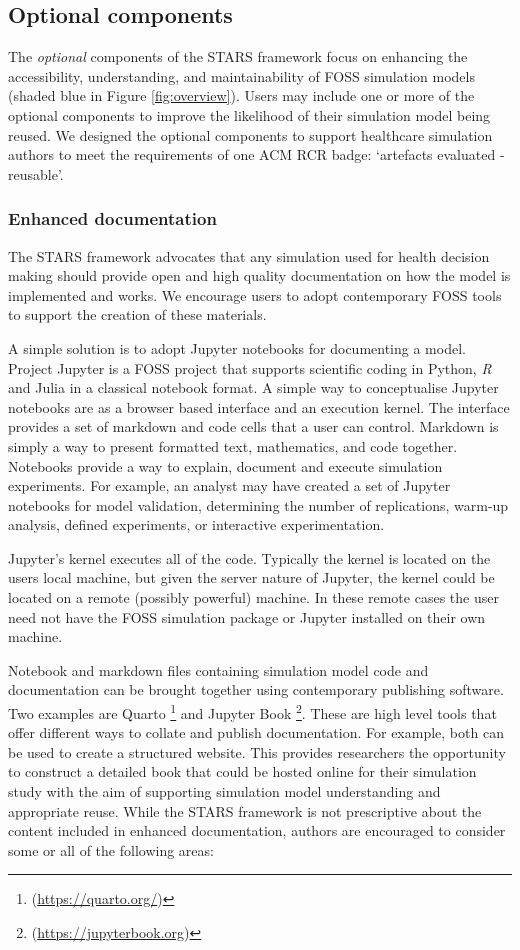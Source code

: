 \documentclass[]{interact}
\theoremstyle{plain}%
\theoremstyle{definition}
\theoremstyle{remark}
\begin{document}
\subsection{Optional components}

The \textit{optional} components of the STARS framework focus on enhancing the accessibility, understanding, and maintainability of FOSS simulation models  (shaded blue in Figure \ref{fig:overview}).  Users may include one or more of the optional components to improve the likelihood of their simulation model being reused. We designed the optional components to support healthcare simulation authors to meet the requirements of one ACM RCR badge: `artefacts evaluated - reusable'.

\subsubsection{Enhanced documentation}
\label{enhanced_docs}

The STARS framework advocates that any simulation used for health decision making should provide open and high quality documentation on how the model is implemented and works. We encourage users to adopt contemporary FOSS tools to support the creation of these materials.  

A simple solution is to adopt Jupyter notebooks for documenting a model.  Project Jupyter is a FOSS project that supports scientific coding in Python, \textit{R} and Julia in a classical notebook format.  A simple way to conceptualise Jupyter notebooks are as a browser based interface and an execution kernel.  The interface provides a set of markdown and code cells that a user can control. Markdown is simply a way to present formatted text, mathematics, and code together. Notebooks provide a way to explain, document and execute simulation experiments. For example, an analyst may have created a set of Jupyter notebooks for model validation, determining the number of replications, warm-up analysis, defined experiments, or interactive experimentation.  

Jupyter's kernel executes all of the code.  Typically the kernel is located on the users local machine, but given the server nature of Jupyter, the kernel could be located on a remote (possibly powerful) machine.  In these remote cases the user need not have the FOSS simulation package or Jupyter installed on their own machine.


Notebook and markdown files containing simulation model code and documentation can be brought together using contemporary publishing software. Two examples are Quarto \footnote{(\url{https://quarto.org/})} and Jupyter Book \footnote{(\url{https://jupyterbook.org})}.  These are high level tools that offer different ways to collate and publish documentation. For example, both can be used to create a structured website. This provides researchers the opportunity to construct a detailed book that could be hosted online for their simulation study with the aim of supporting simulation model understanding and appropriate reuse. While the STARS framework is not prescriptive about the content included in enhanced documentation, authors are encouraged to consider some or all of the following areas:
\end{document}
